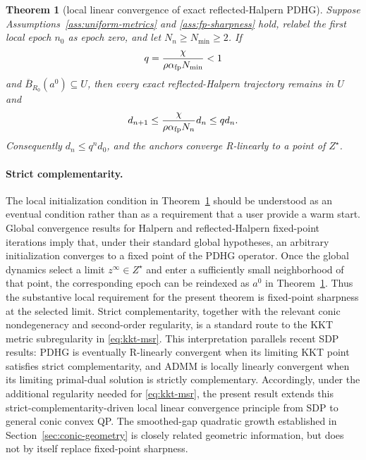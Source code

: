 \documentclass[letterpaper]{article} %
\newtheorem{theorem}{Theorem}[section] %
\theoremstyle{definition}
\theoremstyle{remark}
\begin{document}
\begin{theorem}[local linear convergence of exact reflected-Halpern PDHG]
\label{thm:exact-local-linear}
\label{thm:main-local-linear}
Suppose Assumptions~\ref{ass:uniform-metrics} and
\ref{ass:fp-sharpness} hold, relabel the first local epoch $n_0$ as epoch zero,
and let $N_n\ge N_{\min}\ge2$.  If
\begin{equation}
\label{eq:restart-length-condition}
    q
    =
    \frac{\chi}{\rho\alpha_{\rm fp}N_{\min}}
    <1
\end{equation}
and $\overline B_{R_0}(a^0)\subseteq U$, then every exact
reflected-Halpern trajectory remains in $U$ and
\begin{equation}
\label{eq:exact-contraction}
    d_{n+1}
    \le
    \frac{\chi}{\rho\alpha_{\rm fp}N_n}d_n
    \le
    qd_n.
\end{equation}
Consequently $d_n\le q^nd_0$, and the anchors converge R-linearly to a point
of $Z^\star$.
\end{theorem}

\paragraph{Strict complementarity.}
The local initialization condition in
Theorem~\ref{thm:exact-local-linear} should be understood as an eventual
condition rather than as a requirement that a user provide a warm start.
Global convergence results for Halpern and reflected-Halpern fixed-point
iterations \cite{lu2024restarted,liu2026reflected} imply that, under their
standard global hypotheses, an arbitrary initialization converges to a
fixed point of the PDHG operator.  Once the global dynamics select a
limit $z^\infty\in Z^\star$ and enter a sufficiently small neighborhood of
that point, the corresponding epoch can be reindexed as $a^0$ in
Theorem~\ref{thm:exact-local-linear}.  Thus the substantive local requirement
for the present theorem is fixed-point sharpness at the selected limit.
Strict complementarity, together with the relevant conic nondegeneracy and
second-order regularity, is a standard route to the KKT metric subregularity
in \eqref{eq:kkt-msr}.  This interpretation parallels recent SDP results:
PDHG \cite{jiang2026pdhgsdp} is eventually R-linearly convergent when its
limiting KKT point satisfies strict complementarity, and ADMM
\cite{kang2025admmsdp} is locally linearly convergent when its limiting
primal-dual solution is strictly complementary.  Accordingly, under the additional regularity needed
for \eqref{eq:kkt-msr}, the present result extends this
strict-complementarity-driven local linear convergence principle from SDP to
general conic convex QP.  The smoothed-gap quadratic growth established in
Section~\ref{sec:conic-geometry} is closely related geometric information, but
does not by itself replace fixed-point sharpness.
\end{document}
